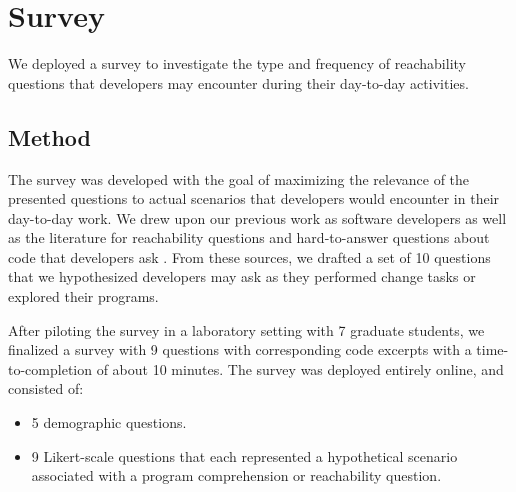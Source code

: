 
\newcommand{\numStarted}{100}
\newcommand{\numFinished}{67}
\newcommand{\writeCodeDaily}{57}
\newcommand{\writeCodeTwoDays}{9}
\newcommand{\writeCodeOnceMonth}{1}

\newcommand{\canada}{21}
\newcommand{\usa}{20}
\newcommand{\germany}{8}
\newcommand{\russia}{8}
\newcommand{\uk}{2}

\newcommand{\zeroToTwo}{26.87}
\newcommand{\twoToFive}{29.85}
\newcommand{\fiveToSeven}{11.94}
\newcommand{\sevenPlus}{31.34}

\newcommand{\java}{14.93}
\newcommand{\kotlin}{13.43}
\newcommand{\python}{13.43}
\newcommand{\cpp}{11.94}
\newcommand{\typescript}{11.94}
\newcommand{\other}{34.33}

\chapter{Survey}
\label{ch:Survey}

\noindent We deployed a survey to investigate the type and frequency of
reachability questions that developers may encounter during their day-to-day 
activities.

\section{Method}
\label{sec:method}

\noindent The survey was developed with the goal of maximizing the relevance of 
the presented questions to actual scenarios that developers would encounter in
their day-to-day work.
We drew upon our previous work as software developers as well as the literature
for reachability questions \cite{latoza-2010-reach} and hard-to-answer
questions about code that developers ask \cite{latoza-2010-hard-questions}.
From these sources, we drafted a set of 10 questions that we hypothesized 
developers may ask as they performed change tasks or explored their programs.

\par After piloting the survey in a laboratory setting with 7 graduate
students, we finalized a survey with 9 questions with corresponding code
excerpts with a time-to-completion of about 10 minutes.
The survey was deployed entirely online, and consisted of:
\begin{itemize}
    \item 5 demographic questions.
    \item 9 Likert-scale questions that each represented a hypothetical 
          scenario associated with a program comprehension or reachability 
          question.
\end{itemize}

